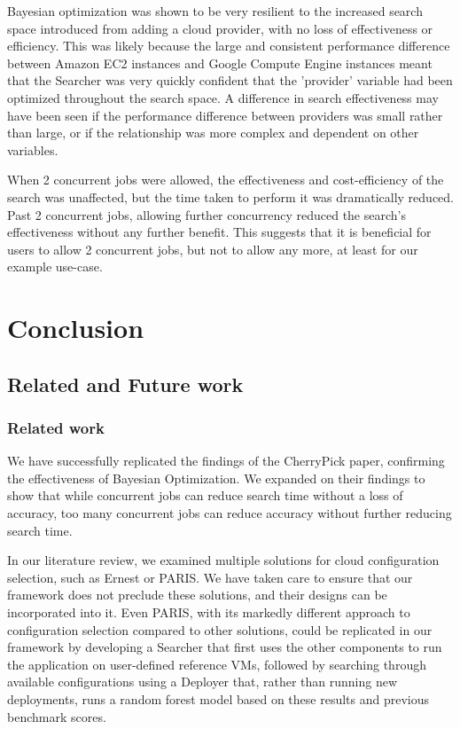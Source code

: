 \documentclass{report}
\begin{document}
Bayesian optimization was shown to be very resilient to the increased search space introduced from adding a cloud provider, with no loss of effectiveness or efficiency. This was likely because the large and consistent performance difference between Amazon EC2 instances and Google Compute Engine instances meant that the Searcher was very quickly confident that the 'provider' variable had been optimized throughout the search space. A difference in search effectiveness may have been seen if the performance difference between providers was small rather than large, or if the relationship was more complex and dependent on other variables.

When 2 concurrent jobs were allowed, the effectiveness and cost-efficiency of the search was unaffected, but the time taken to perform it was dramatically reduced. Past 2 concurrent jobs, allowing further concurrency reduced the search's effectiveness without any further benefit. This suggests that it is beneficial for users to allow 2 concurrent jobs, but not to allow any more, at least for our example use-case. 
\chapter{Conclusion}
\section{Related and Future work}
\subsection{Related work}
We have successfully replicated the findings of the CherryPick\cite{Alipourfard2017} paper, confirming the effectiveness of Bayesian Optimization. We expanded on their findings to show that while concurrent jobs can reduce search time without a loss of accuracy, too many concurrent jobs can reduce accuracy without further reducing search time.

In our literature review, we examined multiple solutions for cloud configuration selection, such as Ernest\cite{Venkataraman2016} or PARIS\cite{Yadwadkar2017}. We have taken care to ensure that our framework does not preclude these solutions, and their designs can be incorporated into it. Even PARIS, with its markedly different approach to configuration selection compared to other solutions, could be replicated in our framework by developing a Searcher that first uses the other components to run the application on user-defined reference VMs, followed by searching through available configurations using a Deployer that, rather than running new deployments, runs a random forest model based on these results and previous benchmark scores. 
\end{document}
